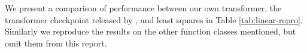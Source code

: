We present a comparison of performance between our own transformer, the transformer checkpoint released by \cite{garg2022what}, and least squares in Table \ref{tab:linear-repro}. Similarly we reproduce the results on the other function classes mentioned, but omit them from this report.
  
  \begin{table}[H]
  \centering
    \caption{Normalised squared error according to \eqref{error}. Our transformer, vs. released checkpoint from \cite{garg2022what} vs. least squares. }
  
  \label{tab:linear-repro}
  \end{table}